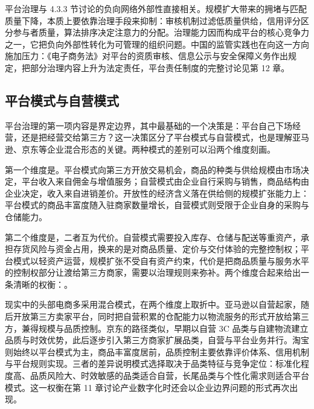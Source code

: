 平台治理与 4.3.3 节讨论的负向网络外部性直接相关。规模扩大带来的拥堵与匹配质量下降，本质上要依靠治理手段来抑制：审核机制过滤低质量供给，信用评分区分参与者质量，算法排序决定注意力的分配。治理能力因而构成平台的核心竞争力之一，它把负向外部性转化为可管理的组织问题。中国的监管实践也在向这一方向施加压力：《电子商务法》对平台的资质审核、信息公示与安全保障义务作出规定，把部分治理内容上升为法定责任，平台责任制度的完整讨论见第 12 章。

\subsection{平台模式与自营模式}

平台治理的第一项内容是界定边界，其中最基础的一个决策是：平台自己下场经营，还是把经营交给第三方？这一决策区分了平台模式与自营模式，也是理解亚马逊、京东等企业混合形态的关键。两种模式的差别可以沿两个维度刻画。

第一个维度是。平台模式向第三方开放交易机会，商品的种类与供给规模由市场决定，平台收入来自佣金与增值服务；自营模式由企业自行采购与销售，商品结构由企业决定，收入来自进销差价。开放性的经济含义落在供给侧的规模扩张能力上：平台模式的商品丰富度随入驻商家数量增长，自营模式则受限于企业自身的采购与仓储能力。

第二个维度是，二者互为代价。自营模式需要投入库存、仓储与配送等重资产，承担存货风险与资金占用，换来的是对商品质量、定价与交付体验的完整控制权；平台模式以轻资产运营，规模扩张不受自有资产约束，代价是把商品质量与服务水平的控制权部分让渡给第三方商家，需要以治理规则来弥补。两个维度合起来给出一条清晰的权衡：。

现实中的头部电商多采用混合模式，在两个维度上取折中。亚马逊以自营起家，随后开放第三方卖家平台，同时把自营积累的仓配能力以物流服务的形式开放给第三方，兼得规模与品质控制。京东的路径类似，早期以自营 3C 品类与自建物流建立品质与时效优势，此后逐步引入第三方商家扩展品类，自营与平台业务并行。淘宝则始终以平台模式为主，商品丰富度居前，品质控制主要依靠评价体系、信用机制与平台规则实现。三者的差异说明模式选择取决于品类特征与竞争定位：标准化程度高、品质风险大、时效敏感的品类适合自营，长尾品类与个性化需求则适合平台模式。这一权衡在第 11 章讨论产业数字化时还会以企业边界问题的形式再次出现。

